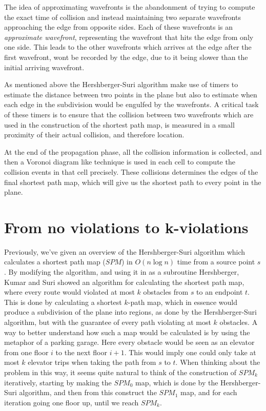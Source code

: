 The idea of approximating wavefronts is the abandonment of trying to compute the exact 
time of collision and instead maintaining two separate wavefronts approaching the edge 
from opposite sides. Each of these wavefronts is an \textit{approximate wavefront}, 
representing the wavefront that hits the edge from only one side. This leads to the 
other wavefronts which arrives at the edge after the first wavefront, wont be recorded by 
the edge, due to it being slower than the initial arriving wavefront.

As mentioned above the Hershberger-Suri algorithm make use of timers to estimate the 
distance between two points in the plane but also to estimate when each edge in the 
subdivision would be engulfed by the wavefronts. A critical task of these timers is to 
ensure that the collision between two wavefronts which are used in the construction of 
the shortest path map, is measured in a small proximity of their actual collision, and 
therefore location.

At the end of the propagation phase, all the collision information is collected, and 
then a Voronoi diagram like technique is used in each cell to compute the collision 
events in that cell precisely. These collisions determines the edges of the final 
shortest path map, which will give us the shortest path to every point in the plane.

\section{From no violations to k-violations}

Previously, we've given an overview of the Hershberger-Suri algorithm which calculates a 
shortest path map ($SPM$) in $O(n\log n)$ time from a source point $s$ 
\cite{HershbergerS99}. By modifying the algorithm, and using it in as a subroutine 
Hershberger, Kumar and Suri showed an algorithm for calculating the shortest path map, 
where every route would violated at most $k$ obstacles from $s$ to an endpoint 
$t$\cite{HershbergerKS17}. This  is done by calculating a shortest $k$-path map, which in 
essence would produce a subdivision of the plane into regions, as done by the 
Hershberger-Suri algorithm, but with the guarantee of every path violating at most $k$ 
obstacles. A way to better understand how such a map would be calculated is by using the 
metaphor of a parking garage. Here every obstacle would be seen as an elevator from one 
floor $i$ to the next floor $i+1$. This would imply one could only take at most $k$ 
elevator trips when taking the path from $s$ to $t$. When thinking about the problem in 
this way, it seems quite natural to think of the construction of $SPM_k$ iteratively, 
starting by making the $SPM_0$ map, which is done by the Hershberger-Suri algorithm, and 
then from this construct the $SPM_1$ map, and for each iteration going one floor up, 
until we reach $SPM_{k}$.

